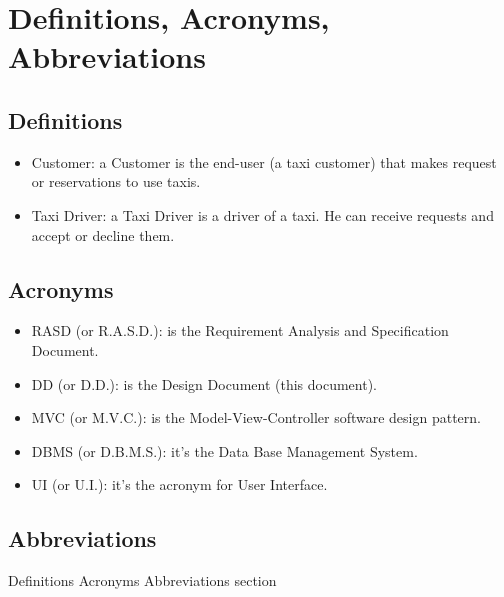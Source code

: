 \documentclass[../../../../dd.tex]{subfiles}
\begin{document}
	\section{Definitions, Acronyms, Abbreviations}

		\subsection{Definitions}
			\begin{itemize}
				\item Customer: a Customer is the end-user (a taxi customer) that makes request or reservations to use taxis.
				\item Taxi Driver: a Taxi Driver is a driver of a taxi. He can receive requests and accept or decline them.
			\end{itemize}

		\subsection{Acronyms}
			\begin{itemize}
				\item RASD (or R.A.S.D.): is the Requirement Analysis and Specification Document.
				\item DD (or D.D.): is the Design Document (this document).
				\item MVC (or M.V.C.): is the Model-View-Controller software design pattern.
				\item DBMS (or D.B.M.S.): it's the Data Base Management System.
				\item UI (or U.I.): it's the acronym for User Interface.
			\end{itemize}

		\subsection{Abbreviations}

	Definitions Acronyms Abbreviations section
\end{document}
